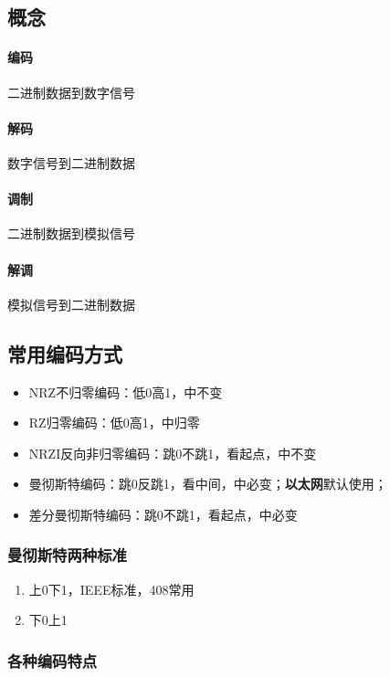 \subsection{概念}

\paragraph{编码}
二进制数据到数字信号

\paragraph{解码}
数字信号到二进制数据

\paragraph{调制}
二进制数据到模拟信号

\paragraph{解调}
模拟信号到二进制数据


\subsection{常用编码方式}
\begin{itemize}
    \item NRZ不归零编码：低0高1，中不变
    \item RZ归零编码：低0高1，中归零
    \item NRZI反向非归零编码：跳0不跳1，看起点，中不变
    \item 曼彻斯特编码：跳0反跳1，看中间，中必变；\textbf{以太网}默认使用；
    \item 差分曼彻斯特编码：跳0不跳1，看起点，中必变
\end{itemize}

\subsubsection{曼彻斯特两种标准}
\begin{enumerate}
    \item 上0下1，IEEE标准，408常用
    \item 下0上1
\end{enumerate}


\subsubsection{各种编码特点}


